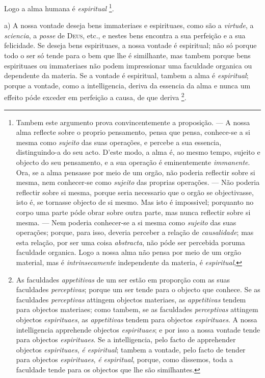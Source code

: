 Logo a alma humana é \emph{espiritual} \footnote{Tambem este argumento prova convincentemente a proposição. --- A nossa alma reflecte sobre o proprio pensamento, pensa que pensa, conhece-se a si mesma como \emph{sujeito} das suas operações, e percebe a sua essencia, distinguindo-a do seu acto. D'este modo, a alma é, ao mesmo tempo, sujeito e objecto do seu pensamento, e a sua operação é eminentemente \emph{immanente}. Ora, se a alma pensasse por meio de um orgão, não poderia reflectir sobre si mesma, nem conhecer-se como \emph{sujeito} das proprias operações. --- Não poderia reflectir sobre si mesma, porque seria necessario que o orgão se objectivasse, isto é, se tornasse objecto de si mesmo. Mas isto é impossivel; porquanto no corpo uma parte póde obrar sobre outra parte, mas nunca reflectir sobre si mesma. --- Nem poderia conhecer-se a si mesma como \emph{sujeito} das suas operações; porque, para isso, deveria perceber a relação de \emph{causalidade}; mas esta relação, por ser uma coisa \emph{abstracta}, não póde ser percebida poruma faculdade organica. Logo a nossa alma não pensa por meio de um orgão material, mas é \emph{intrinsecamente} independente da materia, é \emph{espiritual},}.


  

a) A nossa vontade deseja bens immateriaes e espirituaes, como são a \emph{virtude}, a \emph{sciencia}, a \emph{posse} de \textsc{Deus}, etc., e nestes bens encontra a sua perfeição e a sua felicidade. Se deseja bens espirituaes, a nossa vontade é espiritual; não só porque todo o ser só tende para o bem que lhe é similhante, mas tambem porque bens espirituaes ou immateriaes não podem impressionar uma faculdade organica ou dependente da materia. Se a vontade é espiritual, tambem a alma é \emph{espiritual}; porque a vontade, como a intelligencia, deriva da essencia da alma e nunca um effeito póde exceder em perfeição a causa, de que deriva \footnote{As faculdades \emph{appetitivas} de um ser estão em proporção com as suas faculdades \emph{perceptivas}; porque um ser tende para o objecto que conhece. Se as faculdades \emph{perceptivas} attingem objectos materiaes, as \emph{appetitivas} tendem para objectos materiaes; como tambem, se as faculdades \emph{perceptivas} attingem objectos \emph{espirituaes}, as \emph{appetitivas} tendem para objectos \emph{espirituaes}. A nossa intelligencia apprehende objectos \emph{espirituaes}; e por isso a nossa vontade tende para objectos \emph{espirituaes}. Se a intelligencia, pelo facto de apprehender objectos \emph{espirituaes}, \emph{é espiritual}; tambem a vontade, pelo facto de tender para objectos \emph{espirituaes}, \emph{é espiritual}, porque, como dissemos, toda a faculdade tende para os objectos que lhe são similhantes.}.

